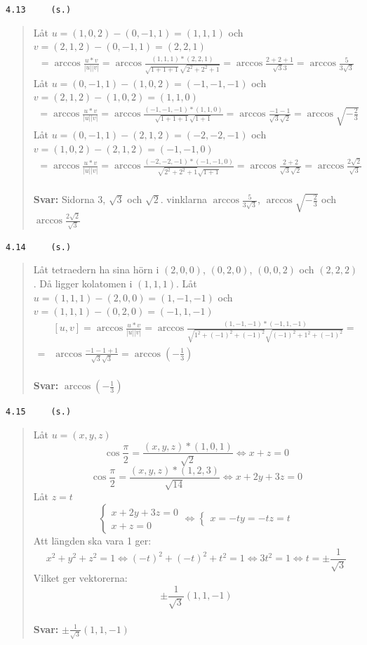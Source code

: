 \documentclass[a4paper]{article}
\newcommand{\tskcol}[1]{\textcolor{tskcol}{#1}}
\begin{document}
\texttt{\tskcol{4.13~~~~ (s.)}}
\begin{quotation}
	\noindent
	Låt $u=(1,0,2)-(0,-1,1)=(1,1,1)$ och $v=(2,1,2)-(0,-1,1)=(2,2,1)$
	\begin{align*}
	[u,v]=
	\arccos\frac{u*v}{|u||v|}=
	\arccos\frac{(1,1,1)*(2,2,1)}{\sqrt{1+1+1}\sqrt{2^2+2^2+1}}=
	\arccos\frac{2+2+1}{\sqrt{3}3}=
	\arccos\frac{5}{3\sqrt{3}}
	\end{align*}
	Låt $u=(0,-1,1)-(1,0,2)=(-1,-1,-1)$ och $v=(2,1,2)-(1,0,2)=(1,1,0)$
	\begin{align*}
	[u,v]=
	\arccos\frac{u*v}{|u||v|}=
	\arccos\frac{(-1,-1,-1)*(1,1,0)}{\sqrt{1+1+1}\sqrt{1+1}}=
	\arccos\frac{-1-1}{\sqrt{3}\sqrt{2}}=
	\arccos\sqrt{-\frac{2}{3}}
	\end{align*}
	Låt $u=(0,-1,1)-(2,1,2)=(-2,-2,-1)$ och $v=(1,0,2)-(2,1,2)=(-1,-1,0)$
	\begin{align*}
	[u,v]=
	\arccos\frac{u*v}{|u||v|}=
	\arccos\frac{(-2,-2,-1)*(-1,-1,0)}{\sqrt{2^2+2^2+1}\sqrt{1+1}}=
	\arccos\frac{2+2}{\sqrt{3}\sqrt{2}}=
	\arccos\frac{2\sqrt{2}}{\sqrt{3}}
	\end{align*}
	\\
	\textbf{Svar:} Sidorna $3$, $\sqrt{3}$ och $\sqrt{2}$. vinklarna $\arccos\frac{5}{3\sqrt{3}}$, $\arccos\sqrt{-\frac{2}{3}}$ och $\arccos\frac{2\sqrt{2}}{\sqrt{3}}$
\end{quotation}

\pagebreak
\texttt{\tskcol{4.14~~~~ (s.)}}
\begin{quotation}
	\noindent
	Låt tetraedern ha sina hörn i $(2,0,0)$, $(0,2,0)$, $(0,0,2)$ och $(2,2,2)$. Då ligger kolatomen i $(1,1,1)$.
	Låt $u = (1,1,1)-(2,0,0) = (1,-1,-1)$ och $v= (1,1,1)-(0,2,0) = (-1,1,-1)$
	\begin{align*}
	&[u,v] = \arccos\frac{u*v}{|u||v|} =
	\arccos\frac{(1,-1,-1)*(-1,1,-1)}{\sqrt{1^2+(-1)^2+(-1)^2}\sqrt{(-1)^2+1^2+(-1)^2}}= \\ =
	&\arccos\frac{-1-1+1}{\sqrt{3}\sqrt{3}}=
	\arccos\left(-\frac{1}{3}\right)
	\end{align*}
	\\
	\textbf{Svar:} $\arccos\left(-\frac{1}{3}\right)$
\end{quotation}

\texttt{\tskcol{4.15~~~~ (s.)}}
\begin{quotation}
	\noindent
	Låt $u=(x,y,z)$
	\[\cos\frac{\pi}{2}=\frac{(x,y,z)*(1,0,1)}{\sqrt{2}} \Leftrightarrow
	x+z=0\]
	\[\cos\frac{\pi}{2}=\frac{(x,y,z)*(1,2,3)}{\sqrt{14}} \Leftrightarrow
	x+2y+3z=0\]
	Låt $z=t$
	\[\begin{cases}
	x+2y+3z=0 \\
	x+z=0
	\end{cases} \Leftrightarrow
	\begin{cases}
	x=-t
	y=-t
	z=t
	\end{cases} \]
	Att längden ska vara 1 ger:
	\[x^2+y^2+z^2=1 \Leftrightarrow
	(-t)^2+(-t)^2+t^2=1 \Leftrightarrow
	3t^2=1 \Leftrightarrow
	t=\pm\frac{1}{\sqrt{3}}\]
	Vilket ger vektorerna:
	\[\pm\frac{1}{\sqrt{3}}(1,1,-1)\]
	\\
	\textbf{Svar:} $\pm\frac{1}{\sqrt{3}}(1,1,-1)$
\end{quotation}
\end{document}

